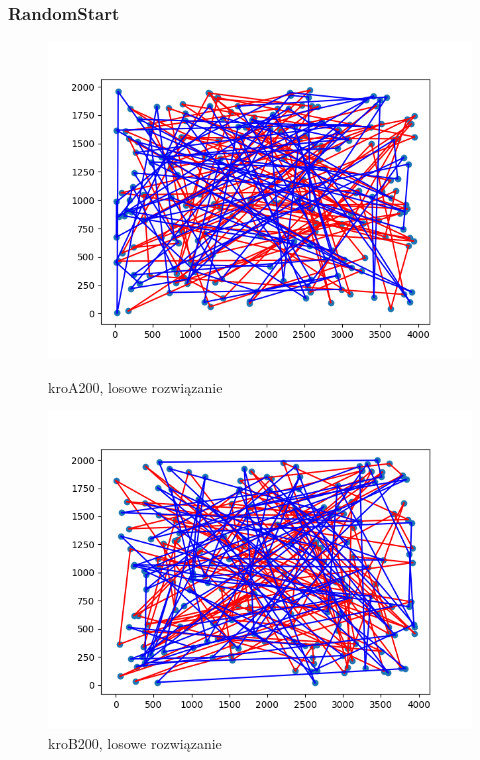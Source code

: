 \documentclass[11pt]{article}
\begin{document}
\subsubsection{RandomStart}
\begin{figure}[H]
    \begin{minipage}[t]{0.45\textwidth}
        \centering
        \includegraphics[width=\linewidth]{best_paths_constructions/kroA200/randomstart}
        \caption{kroA200, losowe rozwiązanie}
    \end{minipage}
    \hfill
    \begin{minipage}[t]{0.45\textwidth}
        \centering
        \includegraphics[width=\linewidth]{best_paths_constructions/kroB200/randomstart}
        \caption{kroB200, losowe rozwiązanie}
    \end{minipage}\label{fig:figure33}
\end{figure}
\end{document}
